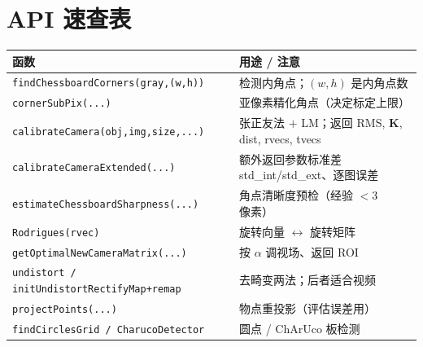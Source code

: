 \section*{API 速查表}
\begin{table}[ht]\centering\small
\begin{tabular}{ll}
\toprule
函数 & 用途 / 注意 \\
\midrule
\texttt{findChessboardCorners(gray,(w,h))} & 检测内角点；$(w,h)$ 是内角点数 \\
\texttt{cornerSubPix(...)} & 亚像素精化角点（决定标定上限）\\
\texttt{calibrateCamera(obj,img,size,...)} & 张正友法 $+$ LM；返回 RMS, $\mathbf{K}$, dist, rvecs, tvecs \\
\texttt{calibrateCameraExtended(...)} & 额外返回参数标准差 std\_int/std\_ext、逐图误差 \\
\texttt{estimateChessboardSharpness(...)} & 角点清晰度预检（经验 $<3$ 像素）\\
\texttt{Rodrigues(rvec)} & 旋转向量 $\leftrightarrow$ 旋转矩阵 \\
\texttt{getOptimalNewCameraMatrix(...)} & 按 $\alpha$ 调视场、返回 ROI \\
\texttt{undistort / initUndistortRectifyMap+remap} & 去畸变两法；后者适合视频 \\
\texttt{projectPoints(...)} & 物点重投影（评估误差用）\\
\texttt{findCirclesGrid / CharucoDetector} & 圆点 / ChArUco 板检测 \\
\bottomrule
\end{tabular}
\end{table}
